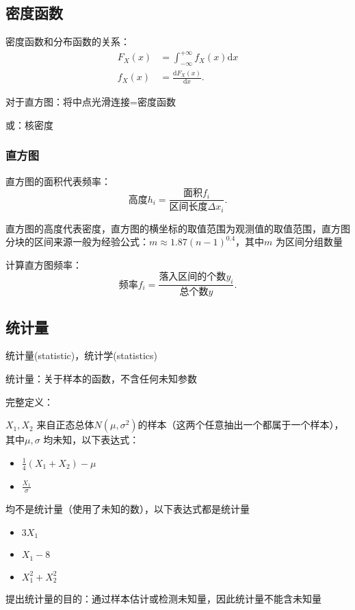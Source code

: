 \subsection{密度函数}%
\label{sub:密度函数}
\begin{notation}
    密度函数和分布函数的关系：
    \begin{align*}
        F_X\left( x \right) &=\int_{-\infty}^{+\infty} f_X\left( x \right)  \mathrm{d}x\\
        f_X\left( x \right) &=\frac{\mathrm{d}F_X\left( x \right) }{\mathrm{d}x} 
    .\end{align*}
\end{notation}
对于直方图：将中点光滑连接=密度函数

或：核密度
\subsubsection*{直方图}%
\label{subsub:直方图}
\begin{notation}
    直方图的面积代表频率：\[
        \text{高度}h_{i}=\frac{\text{面积}f_{i}}{\text{区间长度}\Delta x_{i}} 
    .\] 
\end{notation}
直方图的高度代表密度，直方图的横坐标的取值范围为观测值的取值范围，直方图分块的区间来源一般为经验公式：$m\approx 1.87\left( n-1 \right) ^{0.4}$，其中$m$ 为区间分组数量

计算直方图频率：\[
    \text{频率}f_{i}=\frac{\text{落入区间的个数}y_{i}}{\text{总个数}y} 
.\] 
\subsection{统计量}%
\label{sub:统计量}
统计量(statistic)，统计学(statistics)
\begin{defi}
    统计量：关于样本的函数，不含任何未知参数

    完整定义：
\end{defi}
\begin{eg}
    $X_1,X_2$ 来自正态总体$N\left( \mu,\sigma^2 \right) $的样本（这两个任意抽出一个都属于一个样本），其中$\mu,\sigma$ 均未知，以下表达式：
    \begin{itemize}
        \item $\frac{1}{4} \left( X_1+X_2 \right) -\mu$
        \item $\frac{X_1}{\sigma} $
    \end{itemize}
    均不是统计量（使用了未知的数），以下表达式都是统计量
    \begin{itemize}
        \item $3X_1$
        \item $X_1-8$
        \item $X_1^2+X_2^2$
    \end{itemize}
\end{eg}
提出统计量的目的：通过样本估计或检测未知量，因此统计量不能含未知量

